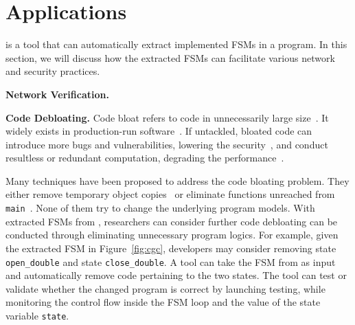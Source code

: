 \section{Applications}

\Tool{} is a tool that can automatically extract implemented FSMs in a program. 
In this section, we will discuss how the extracted FSMs can facilitate 
various network and security practices.  


\noindent\textbf{Network Verification.}

\noindent\textbf{Code Debloating.}
Code bloat refers to code in unnecessarily large size~\cite{code-bloat}.
It widely exists in production-run software~\cite{code-bloat-study}. 
If untackled, bloated code can introduce more bugs and vulnerabilities, 
lowering the security~\cite{protocol-mao}, 
and conduct resultless or redundant computation, 
degrading the performance~\cite{BloatFSE2008,XuBloatPLDI2009,XuBloatPLDI2010}. 

Many techniques have been proposed to address the code bloating problem. 
They either remove temporary object copies~\cite{BloatFSE2008,XuBloatPLDI2009,
XuBloatPLDI2010,Reusable,Cachetor} 
or eliminate functions unreached from 
\texttt{main}~\cite{container-debloating-1, 
container-debloating-2, dinghao-1}. 
None of them try to change the underlying program models.
With extracted FSMs from \Tool{}, researchers can consider 
further code debloating can be conducted through
eliminating unnecessary program logics. 
For example, given the extracted FSM in Figure~\ref{fig:cgc}, 
developers may consider removing state \texttt{open\_double} and 
state \texttt{close\_double}. 
A tool can take the FSM from \Tool{} as input and automatically 
remove code pertaining to the two states. 
The tool can test or validate whether the changed program is correct 
by launching testing, while monitoring the control flow 
inside the FSM loop and the value of the state variable \texttt{state}.

